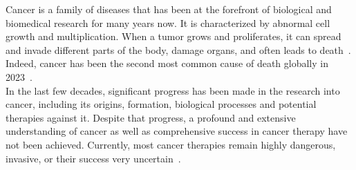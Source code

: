 
Cancer is a family of diseases that has been at the forefront of biological and biomedical research for many years now.
It is characterized by abnormal cell growth and multiplication. When a tumor grows and proliferates, it can spread and invade different parts of the body, damage organs, and often leads to death~\cite{who-cancer}.
Indeed, cancer has been the second most common cause of death globally in 2023~\cite{owid-causes-of-death}.\\
In the last few decades, significant progress has been made in the research into cancer, including its origins, formation, biological processes and potential therapies against it.
Despite that progress, a profound and extensive understanding of cancer as well as comprehensive success in cancer therapy have not been achieved.
Currently, most cancer therapies remain highly dangerous, invasive, or their success very uncertain~\cite{side-effects-cancer-treatments, narrative-review-heterogeneity-challenges}.

